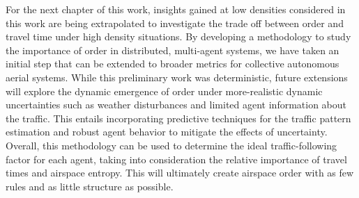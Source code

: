 \documentclass[conference, letter]{IEEEtran}
\newcommand{\aj}[1]{ \textcolor{blue}{\textsc{AJ:} #1  }}
\begin{document}
For the next chapter of this work, insights gained at low densities considered in this work are being extrapolated to investigate the trade off between order and travel time under high density situations. By developing a methodology to study the importance of order in distributed, multi-agent systems, we have taken an initial step that can be extended to broader metrics for collective autonomous aerial systems. While this preliminary work was deterministic, future extensions will explore the dynamic emergence of order under more-realistic dynamic uncertainties such as weather disturbances and limited agent information about the traffic. This entails incorporating predictive techniques for the traffic pattern estimation and robust agent behavior to mitigate the effects of uncertainty. Overall, this methodology can be used to determine the ideal traffic-following factor for each agent, taking into consideration the relative importance of travel times and airspace entropy. This will ultimately create airspace order with as few rules and as little structure as possible.






 

\end{document}
